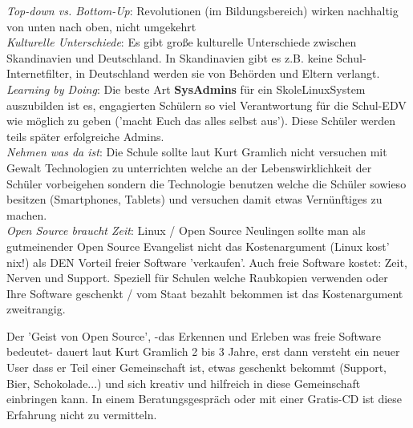 \textit{Top-down vs. Bottom-Up}: Revolutionen (im Bildungsbereich) wirken nachhaltig von unten nach oben, nicht umgekehrt \\

\textit{Kulturelle Unterschiede}: Es gibt große kulturelle Unterschiede zwischen Skandinavien und Deutschland. In Skandinavien gibt es z.B. keine Schul-Internetfilter, in Deutschland werden sie von Behörden und Eltern verlangt. \\

\textit{Learning by Doing}: Die beste Art \textbf{SysAdmins} für ein SkoleLinuxSystem auszubilden ist es, engagierten Schülern so viel Verantwortung für die Schul-EDV wie möglich zu geben ('macht Euch das alles selbst aus'). Diese Schüler werden teils später erfolgreiche Admins. \\

\textit{Nehmen was da ist}: Die Schule sollte laut Kurt Gramlich nicht versuchen mit Gewalt Technologien zu unterrichten welche an der Lebenswirklichkeit der Schüler vorbeigehen sondern die Technologie benutzen welche die Schüler sowieso besitzen (Smartphones, Tablets) und versuchen damit etwas Vernünftiges zu machen. \\

\textit{Open Source braucht Zeit}: Linux / Open Source Neulingen sollte man als gutmeinender Open Source Evangelist nicht das Kostenargument (Linux kost' nix!) als DEN Vorteil freier Software 'verkaufen'. Auch freie Software kostet: Zeit, Nerven und Support. Speziell für Schulen welche Raubkopien verwenden oder Ihre Software geschenkt / vom Staat bezahlt bekommen ist das Kostenargument zweitrangig. 

Der 'Geist von Open Source', -das Erkennen und Erleben was freie Software bedeutet- dauert laut Kurt Gramlich 2 bis 3 Jahre, erst dann versteht ein neuer User dass er Teil einer Gemeinschaft ist, etwas geschenkt bekommt (Support, Bier, Schokolade...) und sich kreativ und hilfreich in diese Gemeinschaft einbringen kann. In einem Beratungsgespräch oder mit einer Gratis-CD ist diese Erfahrung nicht zu vermitteln.

